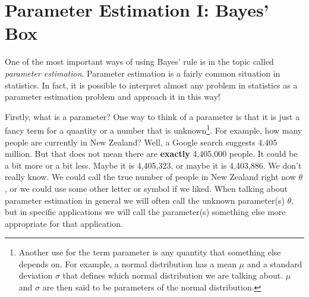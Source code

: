 \chapter{Parameter Estimation I: Bayes' Box}
One of the most important ways of using Bayes' rule is in the topic
called {\it parameter estimation}. Parameter estimation is a fairly common
situation in statistics. In fact, it is possible to interpret almost any
problem in statistics as a parameter estimation problem and approach it
in this way!

Firstly, what is a parameter? One way to think of a parameter is that
it is just a fancy term for a quantity or a number that is
unknown\footnote{Another use for the term parameter
is any quantity that something else depends on. For example, a normal distribution
has a mean $\mu$ and a standard deviation $\sigma$ that defines which normal
distribution we are talking about. $\mu$ and $\sigma$ are then said to be
parameters of the normal distribution.}.
For example, how many people are currently in New
Zealand? Well, a Google search suggests 4.405 million. But that does not mean
there are {\bf exactly} 4,405,000 people. It could be a bit more or a bit
less. Maybe it is 4,405,323, or maybe it is 4,403,886. We don't really know.
We could call the true number of people in New Zealand right now $\theta$, or
we could use some other letter or symbol if we liked. When talking about
parameter estimation in general we will often call the unknown parameter(s)
$\theta$, but in specific applications we will call the parameter(s) something
else more appropriate for that application.

